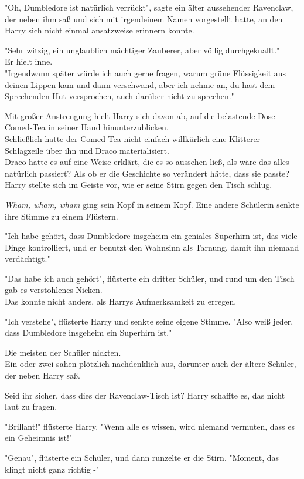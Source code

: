 {"Oh, Dumbledore ist natürlich verrückt", sagte ein älter aussehender Ravenclaw, der neben ihm saß und sich mit irgendeinem Namen vorgestellt hatte, an den Harry sich nicht einmal ansatzweise erinnern konnte.

"Sehr witzig, ein unglaublich mächtiger Zauberer, aber völlig durchgeknallt."\\ Er hielt inne.\\ "Irgendwann später würde ich auch gerne fragen, warum grüne Flüssigkeit aus deinen Lippen kam und dann verschwand, aber ich nehme an, du hast dem Sprechenden Hut versprochen, auch darüber nicht zu sprechen."

Mit großer Anstrengung hielt Harry sich davon ab, auf die belastende Dose Comed-Tea in seiner Hand hinunterzublicken.\\ Schließlich hatte der Comed-Tea nicht einfach willkürlich eine Klitterer-Schlagzeile über ihn und Draco materialisiert.\\ Draco hatte es auf eine Weise erklärt, die es so aussehen ließ, als wäre das alles natürlich passiert? Als ob er die Geschichte so verändert hätte, dass sie passte? Harry stellte sich im Geiste vor, wie er seine Stirn gegen den Tisch schlug.

\emph{Wham, wham, wham} ging sein Kopf in seinem Kopf. Eine andere Schülerin senkte ihre Stimme zu einem Flüstern.

"Ich habe gehört, dass Dumbledore insgeheim ein geniales Superhirn ist, das viele Dinge kontrolliert, und er benutzt den Wahnsinn als Tarnung, damit ihn niemand verdächtigt."

"Das habe ich auch gehört", flüsterte ein dritter Schüler, und rund um den Tisch gab es verstohlenes Nicken.\\ Das konnte nicht anders, als Harrys Aufmerksamkeit zu erregen.

"Ich verstehe", flüsterte Harry und senkte seine eigene Stimme. "Also weiß jeder, dass Dumbledore insgeheim ein Superhirn ist."

Die meisten der Schüler nickten.\\ Ein oder zwei sahen plötzlich nachdenklich aus, darunter auch der ältere Schüler, der neben Harry saß.

Seid ihr sicher, dass dies der Ravenclaw-Tisch ist? Harry schaffte es, das nicht laut zu fragen.

"Brillant!" flüsterte Harry. "Wenn alle es wissen, wird niemand vermuten, dass es ein Geheimnis ist!"

"Genau", flüsterte ein Schüler, und dann runzelte er die Stirn. "Moment, das klingt nicht ganz richtig -"

}
